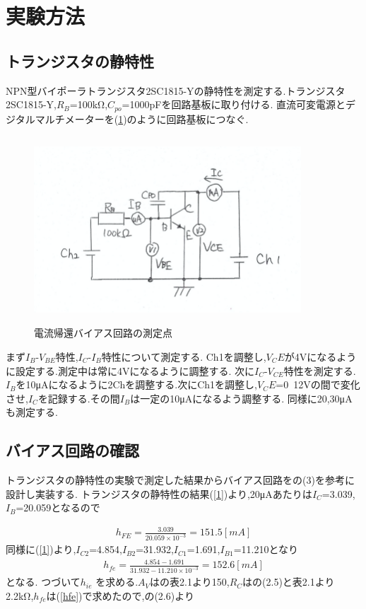 \documentclass[a4j,10pt,dvipdfmx]{jarticle}
\begin{document}
\section{実験方法}
\subsection{トランジスタの静特性}
NPN型バイポーラトランジスタ2SC1815-Yの静特性を測定する.トランジスタ2SC1815-Y,$R_B$=100kΩ,$C_{po}$=1000pFを回路基板に取り付ける.
直流可変電源とデジタルマルチメーターを(\ref{241})のように回路基板につなぐ.
\begin{figure}[H]
  \label{241}
  \begin{center}
  \includegraphics[height=7cm,width=10cm]{241.png}
  \caption{電流帰還バイアス回路の測定点}
\end{center}
\end{figure}
まず$I_B$-$V_{BE}$特性,$I_C$-$I_B$特性について測定する.
Ch1を調整し,$V_CE$が4Vになるように設定する.測定中は常に4Vになるように調整する.
次に$I_C$-$V_{CE}$特性を測定する.$I_B$を10μAになるように2Chを調整する.次にCh1を調整し,$V_CE$=0~12Vの間で変化させ,$I_C$を記録する.その間$I_B$は一定の10μAになるよう調整する.
同様に20,30μAも測定する.

\subsection{バイアス回路の確認}
トランジスタの静特性の実験で測定した結果からバイアス回路を\cite{a}の(3)を参考に設計し実装する.
トランジスタの静特性の結果(\ref{1})より,20μAあたりは$I_C$=3.039,$I_B$=20.059となるので
  
\begin{eqnarray}
  \label{hFE}
  h_{FE}=\frac{3.039}{20.059\times10^{-3}}=151.5[mA]
\end{eqnarray}
同様に(\ref{1})より,$I_{C2}$=4.854,$I_{B2}$=31.932,$I_{C1}$=1.691,$I_{B1}$=11.210となり
\begin{eqnarray}
  \label{hfe}
  h_{fe}=\frac{4.854-1.691}{31.932-11.210\times10^{-3}}=152.6[mA]
\end{eqnarray}
となる.
つづいて$h_{ie}$ を求める.$A_V$は\cite{a}の表2.1より150,$R_C$は\cite{a}の(2.5)と表2.1より2.2kΩ,$h_{fe}$は(\ref{hfe})で求めたので,\cite{a}の(2.6)より
\end{document}
